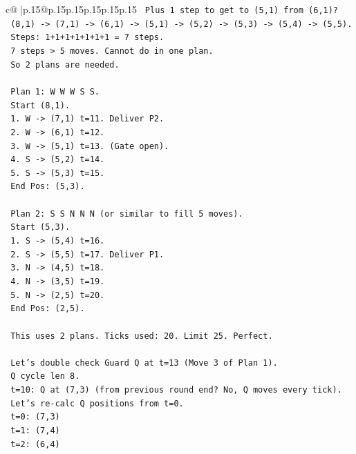 \documentclass{article}
\begin{document}
{\begin{supertabular}{c@{$\;$}|p{.15\linewidth}@{}p{.15\linewidth}p{.15\linewidth}p{.15\linewidth}p{.15\linewidth}p{.15\linewidth}}
{{{\texttt{   Plus 1 step to get to (5,1) from (6,1)?} \\
\texttt{   (8,1) {-}> (7,1) {-}> (6,1) {-}> (5,1) {-}> (5,2) {-}> (5,3) {-}> (5,4) {-}> (5,5).} \\
\texttt{   Steps: 1+1+1+1+1+1+1 = 7 steps.} \\
\texttt{   7 steps > 5 moves. Cannot do in one plan.} \\
\texttt{   So 2 plans are needed.} \\
\\ 
\texttt{   Plan 1: W W W S S.} \\
\texttt{   Start (8,1).} \\
\texttt{   1. W {-}> (7,1) t=11. Deliver P2.} \\
\texttt{   2. W {-}> (6,1) t=12.} \\
\texttt{   3. W {-}> (5,1) t=13. (Gate open).} \\
\texttt{   4. S {-}> (5,2) t=14.} \\
\texttt{   5. S {-}> (5,3) t=15.} \\
\texttt{   End Pos: (5,3).} \\
\\ 
\texttt{   Plan 2: S S N N N (or similar to fill 5 moves).} \\
\texttt{   Start (5,3).} \\
\texttt{   1. S {-}> (5,4) t=16.} \\
\texttt{   2. S {-}> (5,5) t=17. Deliver P1.} \\
\texttt{   3. N {-}> (4,5) t=18.} \\
\texttt{   4. N {-}> (3,5) t=19.} \\
\texttt{   5. N {-}> (2,5) t=20.} \\
\texttt{   End Pos: (2,5).} \\
\\ 
\texttt{   This uses 2 plans. Ticks used: 20. Limit 25. Perfect.} \\
\\ 
\texttt{   Let's double check Guard Q at t=13 (Move 3 of Plan 1).} \\
\texttt{   Q cycle len 8.} \\
\texttt{   t=10: Q at (7,3) (from previous round end? No, Q moves every tick).} \\
\texttt{   Let's re{-}calc Q positions from t=0.} \\
\texttt{   t=0: (7,3)} \\
\texttt{   t=1: (7,4)} \\
\texttt{   t=2: (6,4)} \\
}}}
\end{supertabular}}
\end{document}
